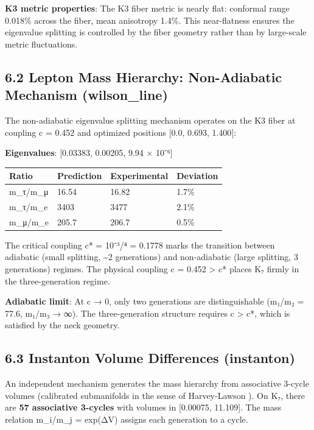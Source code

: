 \documentclass[11pt,a4paper]{article}
\begin{document}
\textbf{K3 metric properties}: The K3 fiber metric is nearly flat: conformal range 0.018\% across the fiber, mean anisotropy 1.4\%. This near-flatness ensures the eigenvalue splitting is controlled by the fiber geometry rather than by large-scale metric fluctuations.

\subsection{6.2 Lepton Mass Hierarchy: Non-Adiabatic Mechanism (wilson\_\allowbreak{}line)}\label{lepton-mass-hierarchy-non-adiabatic-mechanism-wilson_line}

The non-adiabatic eigenvalue splitting mechanism operates on the K3 fiber at coupling c = 0.452 and optimized positions {[}0.0, 0.693, 1.400{]}:

\textbf{Eigenvalues}: {[}0.03383, 0.00205, 9.94 × 10⁻⁶{]}

\begin{longtable}[]{@{}llll@{}}
\toprule\noalign{}
Ratio & Prediction & Experimental & Deviation \\
\midrule\noalign{}
\endhead
\bottomrule\noalign{}
\endlastfoot
m\_\allowbreak{}τ/m\_\allowbreak{}μ & 16.54 & 16.82 & 1.7\% \\
m\_\allowbreak{}τ/m\_\allowbreak{}e & 3403 & 3477 & 2.1\% \\
m\_\allowbreak{}μ/m\_\allowbreak{}e & 205.7 & 206.7 & 0.5\% \\
\end{longtable}

The critical coupling c* = 10⁻³/⁴ = 0.1778 marks the transition between adiabatic (small splitting, \textasciitilde2 generations) and non-adiabatic (large splitting, 3 generations) regimes. The physical coupling c = 0.452 \textgreater{} c* places K₇ firmly in the three-generation regime.

\textbf{Adiabatic limit}: At c → 0, only two generations are distinguishable (m₁/m₂ = 77.6, m₁/m₃ → ∞). The three-generation structure requires c \textgreater{} c*, which is satisfied by the neck geometry.

\subsection{6.3 Instanton Volume Differences (instanton)}\label{instanton-volume-differences-instanton}

An independent mechanism generates the mass hierarchy from associative 3-cycle volumes (calibrated submanifolds in the sense of Harvey-Lawson \cite{23}). On K₇, there are \textbf{57 associative 3-cycles} with volumes in {[}0.00075, 11.109{]}. The mass relation m\_\allowbreak{}i/m\_\allowbreak{}j = exp(ΔV) assigns each generation to a cycle.
\end{document}
